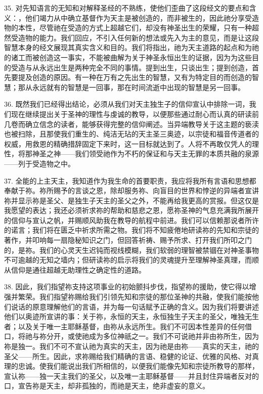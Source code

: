 35. 对先知语言的无知和对解释圣经的不熟练，使他们歪曲了这段经文的要点和含义：，他们竭力从中确立基督作为天主是被创造的，而非被生的，因此祂分享受造物的本性，尽管祂在受造的方式上超越它们，却没有神圣出生的荣耀，只有一种超然受造物的能力。我们回应，不引入任何新的想法或先入为主的意见，而是让这段智慧本身的经文展现其真实含义和目的。我们将指出，祂为天主道路的起点和为祂的诸工而被创造这一事实，不能被曲解为关于神圣永恒出生的证据，因为为这些目的受造与从永远出生是两种完全不同的事情。提到出生，只谈出生；提到创造，首先要提及创造的原因。有一种在万有之先出生的智慧，又有为特定目的而创造的智慧；那从永远就有的智慧是一回事，那在时间流逝中出现的智慧是另一回事。\par

36. 既然我们已经得出结论，必须从我们对天主独生子的信仰宣认中排除一词，我们现在继续提出关于圣神的理性与虔诚的教导，以便那些通过耐心而认真的研读前几卷而确立信念的读者，能够获得完整的信仰阐述。当异端教导关于这主题的亵渎也被扫除，且那使我们重生的、纯洁无玷的天主圣三奥迹，以宗徒和福音传道者的权威，用救恩的精确措辞固定下来时，这一目标就达到了。人将不再敢仅凭人的理性，将那神圣之神——我们领受祂作为不朽的保证和与天主无罪的本质共融的泉源——列于受造物之中。\par

37. 全能的上主天主，我知道作为我生命的首要职责，我应将我所有言语和思想都奉献于祢。祢所赐予的言谈之恩，除却服务祢、向盲目的世界和悖逆的异端者宣讲祢并显示祢是圣父、是独生子天主的圣父之外，不能再给我更高的赏报。但这仅是我愿望的表达；我还必须祈求祢的帮助和慈悲之恩，愿祢圣神的气息充满我所展开的信仰与宣认之帆，并赐顺风助我在教导的航程中前进。我们可以信赖那说者所许的诺言；我们将在匮乏中祈求所需之物。我们将不知疲倦地研读祢的先知和宗徒的著作，并叩响每一扇隐秘知识之门，但回答祈祷、赐予所求、打开我们所叩之门的，是祢。我们的心灵天生迟钝而视线模糊，我们软弱的理智被禁锢在对神圣事物不可逾越的无知之墙内；但研读祢的启示将我们的灵魂提升至理解神圣真理，而顺从信仰是通往超越无助理性之确定性的道路。\par

38. 因此，我们指望祢支持这项事业的初始颤抖步伐，指望祢的援助，使它得以增强并繁荣。我们指望祢赐给我们引领先知和宗徒的那位圣神的共融，使我们能按他们说话的原意理解他们的言语，并为每一句话赋予正确的含义。因为我们将要讲述他们以奥迹所宣讲的事：关于祢，永恒的天主，永恒独生子天主的圣父，唯独无生者；以及关于唯一主耶稣基督，由祢从永远所生。我们不可因本性差异的任何借口，将祂与祢分开，或使祂成为多位神祇之一。我们不可说祂并非由祢所生，因为祢是独一。我们不可不宣认祂为真实的天主，因为祂是由祢——真实的天主，祂的圣父——所生。因此，求祢赐给我们精确的言语、稳健的论证、优雅的风格、对真理的忠诚。使我们能说出我们所相信的，以便我们能像先知和宗徒所教导的那样，宣认祢——独一天主我们的圣父，以及唯一主耶稣基督——并且封住异端者反对的口，宣告祢是天主，却非孤独的，而祂是天主，绝非虚妄的意义。\par

